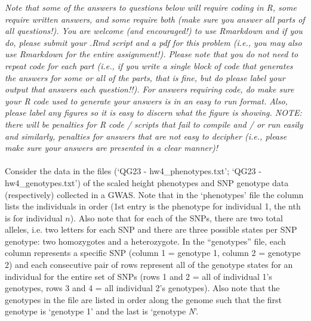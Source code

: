 \documentclass[letterpaper, 11pt]{article}
\begin{document}
\textit{Note that some of the answers to questions below will require coding in R, some require written answers, and some require both (make sure you answer all parts of all questions!).  You are welcome (and encouraged!) to use Rmarkdown and if you do, please submit your .Rmd script and a pdf for this problem (i.e., you may also use Rmarkdown for the entire assignment!).  Please note that you do not need to repeat code for each part (i.e., if you write a single block of code that generates the answers for some or all of the parts, that is fine, but do please label your output that answers each question!!).  For answers requiring code, do make sure your R code used to generate your answers is in an easy to run format.  Also, please label any figures so it is easy to discern what the figure is showing.  NOTE: there will be penalties for R code / scripts that fail to compile and / or run easily and similarly, penalties for answers that are not easy to decipher (i.e., please make sure your answers are presented in a clear manner)!}
\\
\\
Consider the data in the files (`QG23 - hw4\_phenotypes.txt'; `QG23 - hw4\_genotypes.txt') of the scaled height phenotypes and SNP genotype data (respectively) collected in a GWAS.  Note that in the `phenotypes' file the column lists the individuals in order (1st entry is the phenotype for individual 1, the nth is for individual $n$).  Also note that for each of the SNPs, there are two total alleles, i.e. two letters for each SNP and there are three possible states per SNP genotype: two homozygotes and a heterozygote.  In the ``genotypes'' file, each column represents a specific SNP (column 1 = genotype 1, column 2 = genotype 2) and each consecutive pair of rows represent all of the genotype states for an individual for the entire set of SNPs (rows 1 and 2 = all of individual 1's genotypes, rows 3 and 4 = all individual 2's genotypes).  Also note that the genotypes in the file are listed in order along the genome such that the first genotype is `genotype 1' and the last is `genotype \textit{N}'.
  
\end{document}
